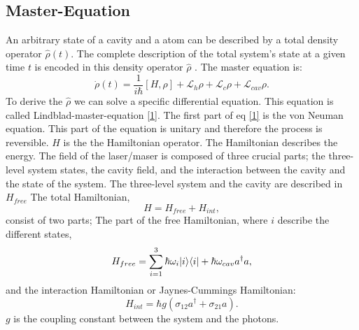 \documentclass[12pt,a4paper]{article}
\DeclarePairedDelimiter\bra{\langle}{\rvert}
\DeclarePairedDelimiter\ket{\lvert}{\rangle}
\begin{document}
\subsection{Master-Equation} 
An arbitrary state of a cavity and a atom can be described by a total density operator $\hat{\rho}(t)$. %
The complete description of the total system's state at a given time $t$ is encoded in this density 
operator $\hat{\rho}$ \cite{Li2017}.
The master equation is:
\begin{equation}
\dot{\rho}(t)=\frac{1}{i \hbar}[H,\rho]+ \mathcal{L}_{h}\rho+ \mathcal{L}_{c}\rho+ \mathcal{L}_{cav}\rho. \label{1}
\end{equation}
To derive the $\hat{\rho}$ we can solve a specific differential equation. This equation is called Lindblad-master-equation \eqref{1}. 
The first part of eq \eqref{1} is the von Neuman equation.%
This part of the equation is unitary and therefore the process is reversible.
$H$ is the the Hamiltonian operator. 
The Hamiltonian describes the energy. 
The field of the laser/maser is composed of three crucial 
parts; the three-level system states, the cavity field, and the interaction between the cavity and the state of the system.
The three-level system and  the  cavity are described in $H_{free}$
The total Hamiltonian,
\begin{equation}
H=H_{free}+H_{int},
\end{equation}
consist of two parts; The part of the free Hamiltonian, where $i$ describe the different states,
\begin{equation}
H_{free}=\sum_{i=1}^3 \hbar \omega_i \ket{i}\bra{i}+\hbar \omega_{cav} a^{\dag}a,\label{2}
\end{equation}
and the interaction Hamiltonian or Jaynes-Cummings Hamiltonian:
\begin{equation}
H_{int}=\hbar g(\sigma_{12}a^{\dag}+\sigma_{21}a).\label{3}
\end{equation}
$g$ is the coupling constant between the system and the photons.  
\end{document}
